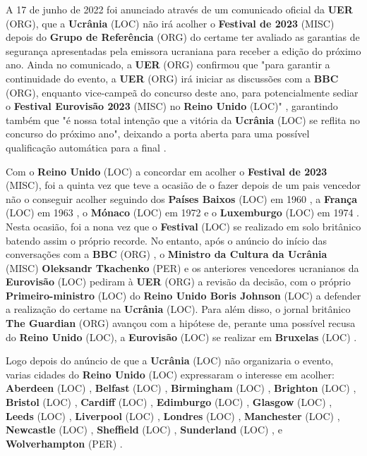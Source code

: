 \documentclass[12pt,a4paper]{article}
\begin{document}
A 17 de junho de 2022 foi anunciado através de um comunicado oficial da \textbf{UER} (ORG), que a \textbf{Ucrânia} (LOC) não irá acolher o \textbf{Festival de 2023} (MISC) depois do \textbf{Grupo de Referência} (ORG) do certame ter avaliado as garantias de segurança apresentadas pela emissora ucraniana para receber a edição do próximo ano. Ainda no comunicado, a \textbf{UER} (ORG) confirmou que "para garantir a continuidade do evento, a \textbf{UER} (ORG) irá iniciar as discussões com a \textbf{BBC} (ORG), enquanto vice-campeã do concurso deste ano, para potencialmente sediar o \textbf{Festival Eurovisão 2023} (MISC) no \textbf{Reino Unido} (LOC)" , garantindo também que "é nossa total intenção que a vitória da \textbf{Ucrânia} (LOC) se reflita no concurso do próximo ano", deixando a porta aberta para uma possível qualificação automática para a final .

Com o \textbf{Reino Unido} (LOC) a concordar em acolher o \textbf{Festival de 2023} (MISC), foi a quinta vez que teve a ocasião de o fazer depois de um pais vencedor não o conseguir acolher seguindo dos \textbf{Países Baixos} (LOC) em 1960 , a \textbf{França} (LOC) em 1963 , o \textbf{Mónaco} (LOC) em 1972 e o \textbf{Luxemburgo} (LOC) em 1974 . Nesta ocasião, foi a nona vez que o \textbf{Festival} (LOC) se realizado em solo britânico batendo assim o próprio recorde. No entanto, após o anúncio do início das conversações com a \textbf{BBC} (ORG) , o \textbf{Ministro da Cultura da Ucrânia} (MISC) \textbf{Oleksandr Tkachenko} (PER) e os anteriores vencedores ucranianos da \textbf{Eurovisão} (LOC) pediram à \textbf{UER} (ORG) a revisão da decisão, com o próprio \textbf{Primeiro-ministro} (LOC) do \textbf{Reino Unido Boris Johnson} (LOC) a defender a realização do certame na \textbf{Ucrânia} (LOC). Para além disso, o jornal britânico \textbf{The Guardian} (ORG) avançou com a hipótese de, perante uma possível recusa do \textbf{Reino Unido} (LOC), a \textbf{Eurovisão} (LOC) se realizar em \textbf{Bruxelas} (LOC) .

Logo depois do anúncio de que a \textbf{Ucrânia} (LOC) não organizaria o evento, varias cidades do \textbf{Reino Unido} (LOC) expressaram o interesse em acolher: \textbf{Aberdeen} (LOC) , \textbf{Belfast} (LOC) , \textbf{Birmingham} (LOC) , \textbf{Brighton} (LOC) , \textbf{Bristol} (LOC) , \textbf{Cardiff} (LOC) , \textbf{Edimburgo} (LOC) , \textbf{Glasgow} (LOC) , \textbf{Leeds} (LOC) , \textbf{Liverpool} (LOC) , \textbf{Londres} (LOC) , \textbf{Manchester} (LOC) , \textbf{Newcastle} (LOC) , \textbf{Sheffield} (LOC) , \textbf{Sunderland} (LOC) , e \textbf{Wolverhampton} (PER) .
\end{document}
